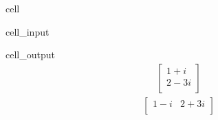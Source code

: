 \documentclass[letterpaper,10pt,english]{jupyterBook}
\begin{document}
\begin{sphinxuseclass}{cell}\begin{sphinxVerbatimInput}

\begin{sphinxuseclass}{cell_input}
\begin{sphinxVerbatim}[commandchars=\\\{\}]
\PYG{p}{[}\PYG{p}{[}\PYG{p}{]}\PYG{p}{[}\PYG{p}{]}\PYG{p}{]}


\end{sphinxVerbatim}

\end{sphinxuseclass}\end{sphinxVerbatimInput}
\begin{sphinxVerbatimOutput}

\begin{sphinxuseclass}{cell_output}\begin{equation*}
\begin{split}\begin{bmatrix}
1 + i  \\
 2 - 3 i  \\
 \end{bmatrix}
\end{split}
\end{equation*}\begin{equation*}
\begin{split}\begin{bmatrix}
1 - i & 2 + 3 i  \\
 \end{bmatrix}
\end{split}
\end{equation*}
\end{sphinxuseclass}\end{sphinxVerbatimOutput}

\end{sphinxuseclass}
\end{document}
